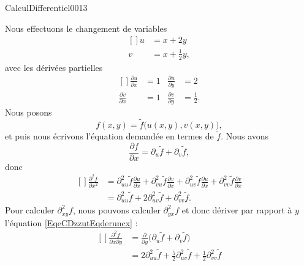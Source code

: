 \begin{corrige}{CalculDifferentiel0013}

	Nous effectuons le changement de variables
	\begin{equation}
		\begin{aligned}[]
			u&=x+2y\\
			v&=x+\frac{ 1 }{2}y,
		\end{aligned}
	\end{equation}
	avec les dérivées partielles
	\begin{equation}
		\begin{aligned}[]
			\frac{ \partial u }{ \partial x }&=1&\frac{ \partial u }{ \partial y }&=2\\
			\frac{ \partial v }{ \partial x }&=1&\frac{ \partial v }{ \partial y }&=\frac{ 1 }{2}.
		\end{aligned}
	\end{equation}
	Nous posons 
	\begin{equation}
		f(x,y)=\tilde f\big( u(x,y),v(x,y) \big),
	\end{equation}
	et puis nous écrivons l'équation demandée en termes de $\tilde f$. Nous avons
	\begin{equation}		\label{EqeCDzzutEqderuncx}
		\frac{ \partial f }{ \partial x }=\partial_u\tilde f+\partial_v\tilde f,
	\end{equation}
	donc
	\begin{equation}
		\begin{aligned}[]
			\frac{ \partial^2f }{ \partial x^2 }&=\partial^2_{uu}\tilde f\frac{ \partial u }{ \partial x }+\partial^2_{vu}\tilde f\frac{ \partial v }{ \partial x }+\partial^2_{uv}\tilde f\frac{ \partial u }{ \partial x }+\partial^2_{vv}\tilde f\frac{ \partial v }{ \partial x }\\
			&=\partial^2_{uu}\tilde f+2\partial^2_{uv}\tilde f+\partial^2_{vv}\tilde f.
		\end{aligned}
	\end{equation}
	Pour calculer $\partial^2_{xy}f$, nous pouvons calculer $\partial^2_{yx}f$ et donc dériver par rapport à $y$ l'équation \eqref{EqeCDzzutEqderuncx} :
	\begin{equation}
		\begin{aligned}[]
			\frac{ \partial^2f }{ \partial x\partial y }&=\frac{ \partial  }{ \partial y }\big( \partial_u\tilde f+\partial_v\tilde f \big)\\
			&=2\partial^2_{uu}\tilde f+\frac{ 5 }{2}\partial^2_{uv}\tilde f+\frac{ 1 }{2}\partial^2_{vv}\tilde f
		\end{aligned}

\end{equation}
\end{corrige}
